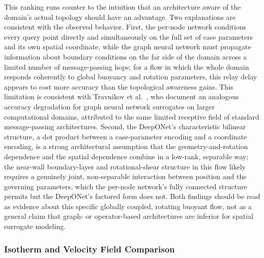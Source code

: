 This ranking runs counter to the intuition that an architecture aware of the domain's actual topology should have an advantage. Two explanations are consistent with the observed behavior. First, the per-node network conditions every query point directly and simultaneously on the full set of case parameters and its own spatial coordinate, while the graph neural network must propagate information about boundary conditions on the far side of the domain across a limited number of message-passing hops; for a flow in which the whole domain responds coherently to global buoyancy and rotation parameters, this relay delay appears to cost more accuracy than the topological awareness gains. This limitation is consistent with Travnikov et al.~\cite{Travnikov2024}, who document an analogous accuracy degradation for graph neural network surrogates on larger computational domains, attributed to the same limited receptive field of standard message-passing architectures. Second, the DeepONet's characteristic bilinear structure, a dot product between a case-parameter encoding and a coordinate encoding, is a strong architectural assumption that the geometry-and-rotation dependence and the spatial dependence combine in a low-rank, separable way; the near-wall boundary-layer and rotational-shear structure in this flow likely requires a genuinely joint, non-separable interaction between position and the governing parameters, which the per-node network's fully connected structure permits but the DeepONet's factored form does not. Both findings should be read as evidence about this specific globally coupled, rotating buoyant flow, not as a general claim that graph- or operator-based architectures are inferior for spatial surrogate modeling.

\subsubsection{Isotherm and Velocity Field Comparison}
\label{subsec:field_viz}

